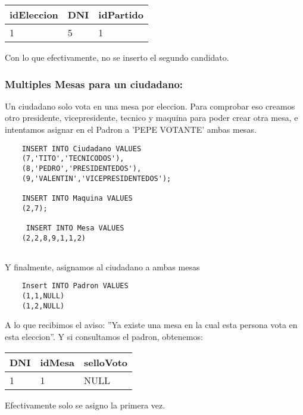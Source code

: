 	\begin{tabular}{| l| l| l|}
	\hline 
	idEleccion & DNI & idPartido \\
	\hline 
	 1 & 5 & 1 \\
	\hline 
	\end{tabular}
\vspace{2mm}
Con lo que efectivamente, no se inserto el segundo candidato.

\subsubsection{Multiples Mesas para un ciudadano:} Un ciudadano solo vota en una mesa por eleccion. Para comprobar eso creamos otro presidente, vicepresidente, tecnico y maquina para poder crear otra mesa, e intentamos asignar en el Padron a 'PEPE VOTANTE' ambas mesas.
	\begin{lstlisting}
	INSERT INTO Ciudadano VALUES
	(7,'TITO','TECNICODOS'),
	(8,'PEDRO','PRESIDENTEDOS'),
	(9,'VALENTIN','VICEPRESIDENTEDOS');
	
	INSERT INTO Maquina VALUES
 	(2,7);
 	
 	 INSERT INTO Mesa VALUES
 	(2,2,8,9,1,1,2)
 
	\end{lstlisting}
	\vspace{2mm}		
	Y finalmente, asignamos al ciudadano a ambas mesas
	\vspace{2mm}
	\begin{lstlisting}
	Insert INTO Padron VALUES
	(1,1,NULL)
	(1,2,NULL)
	\end{lstlisting}
	
	\vspace{2mm}
	
	A lo que recibimos el aviso: ''Ya existe una mesa en la cual esta persona vota en esta eleccion''. Y si consultamos el padron, obtenemos:
	
	\vspace{2mm}
	
	\begin{tabular}{| l| l| l|}
	\hline 
	DNI & idMesa & selloVoto \\
	\hline 
	 1 & 1 & NULL \\
	\hline 
	\end{tabular}
	\vspace{2mm}
	
	Efectivamente solo se asigno la primera vez.
	
